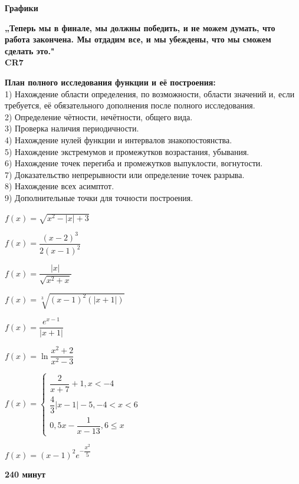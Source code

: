 \centerline{\bf \Huge Графики}


\begin{flushright}
        \scriptsize{\textbf{„Теперь мы в финале, мы должны победить, и не можем думать, что работа закончена. Мы отдадим все, и мы убеждены, что мы сможем сделать это."\\
         CR7}}
        
\end{flushright}
\textbf{План полного исследования функции и её построения:}\\
1) Нахождение области определения, по возможности, области значений и, если $\mbox{требуется}$, её обязательного дополнения после полного исследования.\\
2) Определение чётности, нечётности, общего вида.\\
3) Проверка наличия периодичности.\\
4) Нахождение нулей функции и интервалов знакопостоянства.\\
5) Нахождение экстремумов и промежутков возрастания, убывания.\\
6) Нахождение точек перегиба и промежутков выпуклости, вогнутости.\\
7) Доказательство непрерывности или определение точек разрыва.\\
8) Нахождение всех асимптот.\\
9) Дополнительные точки для точности построения.

 $f(x)=\sqrt{x^{2}-\left|x\right|+3}$

 $f(x)=\dfrac{(x-2)^{3}}{2(x-1)^{2}}$

 $f(x)=\dfrac{\left|x\right|}{\sqrt{x^{2}+x}}$

 $f(x)=\sqrt[3]{\left(x-1\right)^{2}(\left|x+1\right|)}$

 $f(x)=\dfrac{e^{x-1}}{\left|x+1\right|}$

 $f(x)=\ln\dfrac{x^{2}+2}{x^{2}-3}$

 $f(x)=\left\{\begin{array}{l}
\dfrac{2}{x+7}+1, x<-4 \\
\dfrac{4}{3}\left|x-1\right|-5, -4< x<6\\
0,5x-\dfrac{1}{x-13}, 6\leq x 
\end{array}\right.$

 $f(x)=(x-1)^{2}e^{-\dfrac{x^{2}}{5}}$
\centerline{\textbf{240 минут}}

